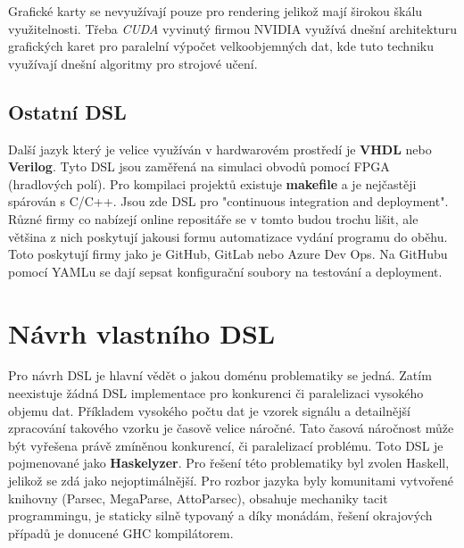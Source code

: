 \documentclass[male,czech]{kithesis}
\begin{document}
Grafické karty se nevyužívají pouze pro rendering jelikož mají širokou škálu
využitelnosti. 
Třeba \textit{CUDA} vyvinutý firmou NVIDIA 
využívá dnešní architekturu grafických karet pro paralelní výpočet 
velkoobjemných dat, kde tuto techniku využívají dnešní algoritmy pro 
strojové učení. 

\section{Ostatní DSL}
Další jazyk který je velice využíván v hardwarovém prostředí je \textbf{VHDL} nebo \textbf{Verilog}. Tyto DSL jsou zaměřená
na simulaci obvodů pomocí FPGA (hradlových polí). 
Pro kompilaci projektů existuje \textbf{makefile} a je nejčastěji spárován s C/C++. 
Jsou zde DSL pro "continuous integration and deployment". 
Různé firmy co nabízejí online repositáře se v tomto budou trochu lišit, ale
většina z nich poskytují jakousi formu automatizace vydání programu do oběhu. Toto poskytují firmy jako je GitHub,
GitLab nebo Azure Dev Ops. Na GitHubu pomocí YAMLu se dají sepsat konfigurační soubory 
na testování a deployment.

{\centering
{}
}

\chapter{Návrh vlastního DSL}
Pro návrh DSL je hlavní vědět o jakou doménu problematiky se jedná.
Zatím neexistuje žádná DSL implementace pro konkurenci či paralelizaci vysokého objemu dat.
Příkladem vysokého počtu dat je vzorek signálu a 
detailnější zpracování takového vzorku je časově velice náročné. Tato časová náročnost může být vyřešena právě zmíněnou
konkurencí, či paralelizací problému. 
Toto DSL je pojmenované jako \textbf{Haskelyzer}.
Pro řešení této problematiky byl zvolen Haskell, jelikož se zdá jako nejoptimálnější.
Pro rozbor jazyka byly komunitami vytvořené knihovny (Parsec, MegaParse, AttoParsec),
obsahuje mechaniky tacit programmingu, 
je staticky silně typovaný a díky monádám, řešení okrajových případů je donucené GHC kompilátorem.
\end{document}
